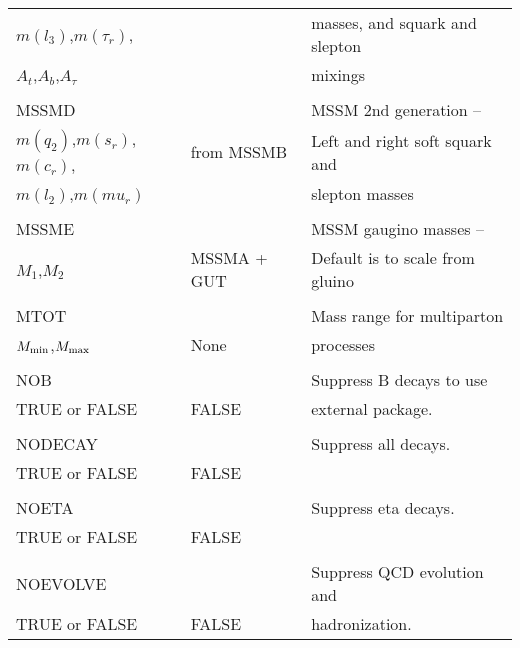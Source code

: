 \begin{center}
\begin{tabular}{lll}
$m(l_3)$,$m(\tau_r)$,  &                   & masses, and squark and slepton \\
$A_t$,$A_b$,$A_\tau$   &                   & mixings                        \\
                       &                   &                                \\
MSSMD                  &                   & MSSM 2nd generation --         \\
$m(q_2)$,$m(s_r)$,$m(c_r)$,  & from MSSMB  & Left and right soft squark and \\
$m(l_2)$,$m(mu_r)$     &                   & slepton masses                 \\
                       &                   &                                \\
MSSME                  &                   & MSSM gaugino masses --         \\
$M_1$,$M_2$            & MSSMA + GUT       & Default is to scale from gluino\\
                       &                   &                                \\
MTOT                   &                   & Mass range for multiparton     \\
$M_{\rm min}$,$M_{\rm max}$ & None         & processes                      \\
                       &                   &                                \\
NOB                    &                   & Suppress B decays to use       \\
TRUE or FALSE          & FALSE             & external package.              \\
                       &                   &                                \\
NODECAY                &                   & Suppress all decays.           \\
TRUE or FALSE          & FALSE             &                                \\
                       &                   &                                \\
NOETA                  &                   & Suppress eta decays.           \\
TRUE or FALSE          & FALSE             &                                \\
                       &                   &                                \\
NOEVOLVE               &                   & Suppress QCD evolution and     \\
TRUE or FALSE          & FALSE             & hadronization.                 \\
\hline\hline
\end{tabular}
\end{center}

